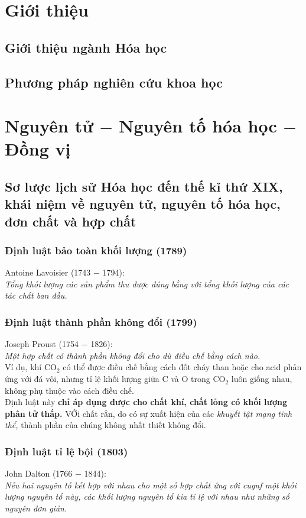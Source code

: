 \chapter{Giới thiệu}
\section{Giới thiệu ngành Hóa học}
\section{Phương pháp nghiên cứu khoa học}
\chapter{Nguyên tử $-$ Nguyên tố hóa học $-$ Đồng vị}
\section{Sơ lược lịch sử Hóa học đến thế kỉ thứ XIX, khái niệm về nguyên tử, nguyên tố hóa học, đơn chất và hợp chất}
\subsection{Định luật bảo toàn khối lượng (1789)}
Antoine Lavoisier (1743 $-$ 1794):\\
\textit{Tổng khối lượng các sản phẩm thu được đúng bằng với tổng khối lượng của các tác chất ban đầu.}
\subsection{Định luật thành phần không đổi (1799)}
Joseph Proust (1754 $-$ 1826):\\
\textit{Một hợp chất có thành phần không đổi cho dù điều chế bằng cách nào.}\\
Ví dụ, khí $\mathrm{CO_2}$ có thể được điều chế bằng cách đốt cháy than hoặc cho acid phản ứng với đá vôi, nhưng tỉ lệ khối lượng giữa $\mathrm{C}$ và $\mathrm{O}$ trong $\mathrm{CO_2}$ luôn giống nhau, không phụ thuộc vào cách điều chế.\\
Định luật này \textbf{chỉ áp dụng được cho chất khí, chất lỏng có khối lượng phân tử thấp.} VỚi chất rắn, do có sự xuất hiện của các \textit{khuyết tật mạng tinh thể,} thành phần của chúng không nhất thiết không đổi.
\subsection{Định luật tỉ lệ bội (1803)}
John Dalton (1766 $-$ 1844):\\
\textit{Nếu hai nguyên tố kết hợp với nhau cho một số hợp chất ứng với cugnf một khối lượng nguyên tố này, các khối lượng nguyên tố kia tỉ lệ với nhau như những số nguyên đơn giản.}
